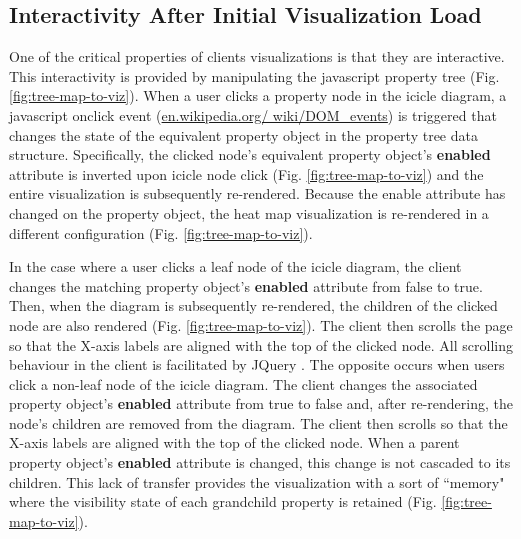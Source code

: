 \subsection{Interactivity After Initial Visualization Load}

One of the critical properties of clients visualizations is that they are interactive. This interactivity is provided by manipulating the \gls{javascript} property tree (Fig. \ref{fig:tree-map-to-viz}). When a user clicks a property node in the icicle diagram, a \gls{javascript} onclick event \cite{dom-events} (\href{http://en.wikipedia.org/wiki/DOM_events}{en.wikipedia.org/ wiki/DOM\_events}) is triggered that changes the state of the equivalent property object in the property tree data structure. Specifically, the clicked node's equivalent property object's \textbf{enabled} attribute is inverted upon icicle node click (Fig. \ref{fig:tree-map-to-viz}) and the entire visualization is subsequently re-rendered. Because the enable attribute has changed on the property object, the heat map visualization is re-rendered in a different configuration (Fig. \ref{fig:tree-map-to-viz}). 

In the case where a user clicks a leaf node of the icicle diagram, the client changes the matching property object's \textbf{enabled} attribute from false to true. Then, when the diagram is subsequently re-rendered, the children of the clicked node are also rendered (Fig. \ref{fig:tree-map-to-viz}). The client then scrolls the page so that the X-axis labels are aligned with the top of the clicked node. All scrolling behaviour in the client is facilitated by JQuery \cite{li2012jquery}. The opposite occurs when users click a non-leaf node of the icicle diagram. The client changes the associated property object's \textbf{enabled} attribute from true to false and, after re-rendering, the node's children are removed from the diagram. The client then scrolls so that the X-axis labels are aligned with the top of the clicked node. When a parent property object's \textbf{enabled} attribute is changed, this change is not cascaded to its children. This lack of transfer provides the visualization with a sort of ``memory" where the visibility state of each grandchild property is retained (Fig. \ref{fig:tree-map-to-viz}).

